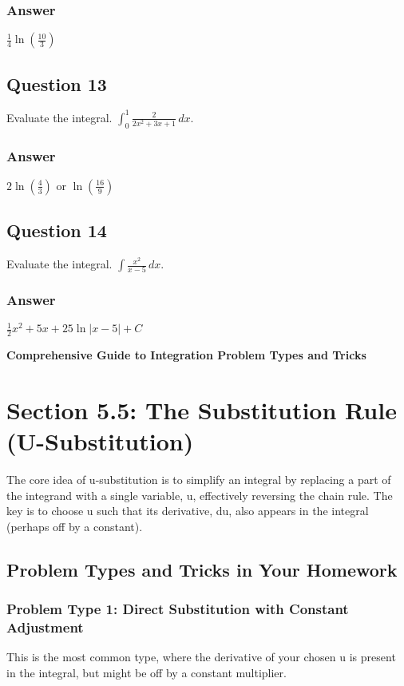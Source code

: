\documentclass{article}
\begin{document}
\subsubsection*{Answer}
$ \frac{1}{4}\ln(\frac{10}{3}) $

\subsection*{Question 13}
Evaluate the integral. $\int_0^1 \frac{2}{2x^2+3x+1} \,dx$.
\subsubsection*{Answer}
$ 2\ln(\frac{4}{3}) $ or $ \ln(\frac{16}{9}) $

\subsection*{Question 14}
Evaluate the integral. $\int \frac{x^2}{x-5} \,dx$.
\subsubsection*{Answer}
$ \frac{1}{2}x^2+5x+25\ln|x-5| + C $





\newpage
\begin{titlepage}
    \centering
    \Huge\bfseries Comprehensive Guide to Integration Problem Types and Tricks \par
    \vspace{1em}
    \vfill
\end{titlepage}

\section{Section 5.5: The Substitution Rule (U-Substitution)}
The core idea of u-substitution is to simplify an integral by replacing a part of the integrand with a single variable, u, effectively reversing the chain rule. The key is to choose u such that its derivative, du, also appears in the integral (perhaps off by a constant).

\subsection{Problem Types and Tricks in Your Homework}
\subsubsection{Problem Type 1: Direct Substitution with Constant Adjustment}
This is the most common type, where the derivative of your chosen u is present in the integral, but might be off by a constant multiplier.
\end{document}
